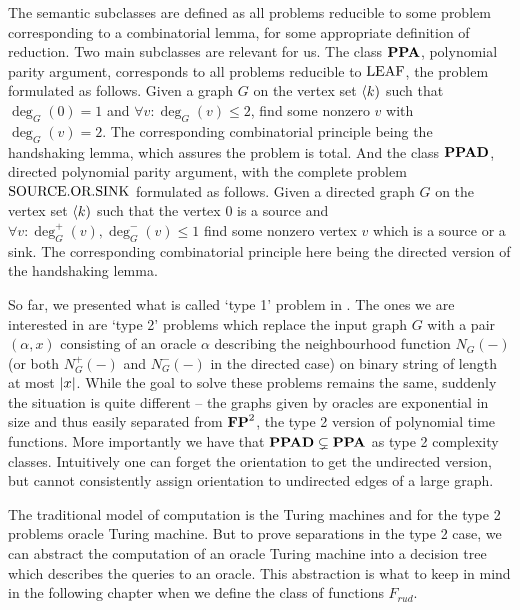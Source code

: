 The semantic subclasses are defined as all problems reducible to some problem corresponding to a combinatorial lemma, for some appropriate definition of reduction. Two main subclasses are relevant for us. The class $\textbf{PPA}$, polynomial parity argument, corresponds to all problems reducible to $\text{LEAF}$, the problem formulated as follows. Given a graph $G$ on the vertex set $\langle k)$ such that $\deg_G(0)=1$ and $\forall v: \deg_G(v)\leq 2$, find some nonzero $v$ with $\deg_G(v)=2$. The corresponding combinatorial principle being the handshaking lemma, which assures the problem is total. And the class $\textbf{PPAD}$, directed polynomial parity argument, with the complete problem $\text{SOURCE.OR.SINK}$ formulated as follows. Given a directed graph $G$ on the vertex set $\langle k)$ such that the vertex $0$ is a source and $\forall v: \deg_G^+(v),\deg_G^-(v)\leq 1$ find some nonzero vertex $v$ which is a source or a sink. The corresponding combinatorial principle here being the directed version of the handshaking lemma.

So far, we presented what is called `type 1' problem in \cite{beame1995rel}. The ones we are interested in are `type 2' problems which replace the input graph $G$ with a pair $(\alpha,x)$ consisting of an oracle $\alpha$ describing the neighbourhood function $N_G(-)$ (or both $N_G^+(-)$ and $N_G^-(-)$ in the directed case) on binary string of length at most $\left|{x}\right|$. While the goal to solve these problems remains the same, suddenly the situation is quite different -- the graphs given by oracles are exponential in size and thus easily separated from $\textbf{FP}^2$, the type 2 version of polynomial time functions. More importantly we have that $\textbf{PPAD}\subsetneq \textbf{PPA}$ as type 2 complexity classes. Intuitively one can forget the orientation to get the undirected version, but cannot consistently assign orientation to undirected edges of a large graph.

The traditional model of computation is the Turing machines and for the type 2 problems oracle Turing machine. But to prove separations in the type 2 case, we can abstract the computation of an oracle Turing machine into a decision tree which describes the queries to an oracle. This abstraction is what to keep in mind in the following chapter when we define the class of functions $F_{rud}$.
